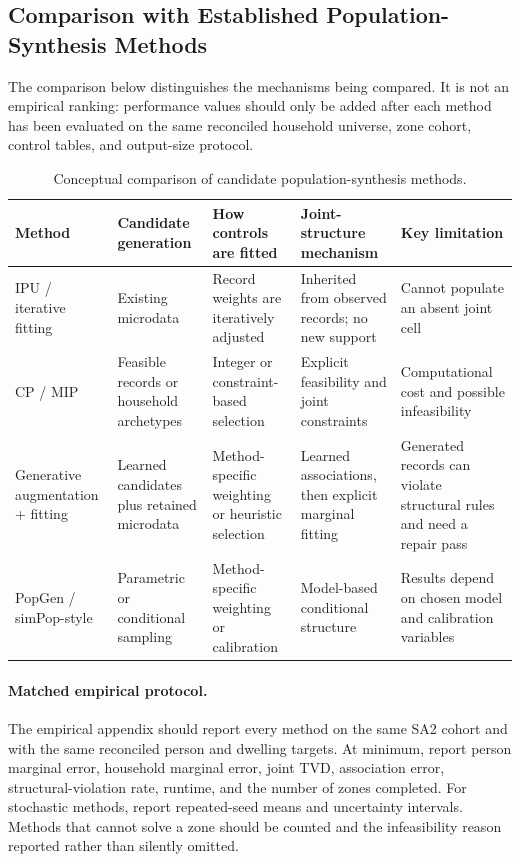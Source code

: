 
\subsection{Comparison with Established Population-Synthesis Methods}
\label{sec:known_methods_comparison}

The comparison below distinguishes the mechanisms being compared. It is not
an empirical ranking: performance values should only be added after each
method has been evaluated on the same reconciled household universe, zone
cohort, control tables, and output-size protocol.

\begin{table}[htbp]
\centering
\small
\caption{Conceptual comparison of candidate population-synthesis methods.}
\label{tab:known-methods-comparison}
\begin{tabular}{@{}p{}p{}p{}p{}p{}@{}}
\toprule
\textbf{Method} & \textbf{Candidate generation} & \textbf{How controls are fitted} &
\textbf{Joint-structure mechanism} & \textbf{Key limitation} \\
\midrule
IPU / iterative fitting &
Existing microdata &
Record weights are iteratively adjusted &
Inherited from observed records; no new support &
Cannot populate an absent joint cell \\
\addlinespace
CP / MIP &
Feasible records or household archetypes &
Integer or constraint-based selection &
Explicit feasibility and joint constraints &
Computational cost and possible infeasibility \\
\addlinespace
Generative augmentation + fitting &
Learned candidates plus retained microdata &
Method-specific weighting or heuristic selection &
Learned associations, then explicit marginal fitting &
Generated records can violate structural rules and need a repair pass \\
\addlinespace
PopGen / simPop-style &
Parametric or conditional sampling &
Method-specific weighting or calibration &
Model-based conditional structure &
Results depend on chosen model and calibration variables \\
\bottomrule
\end{tabular}
\end{table}

\paragraph{Matched empirical protocol.}
The empirical appendix should report every method on the same SA2 cohort and
with the same reconciled person and dwelling targets. At minimum, report
person marginal error, household marginal error, joint TVD, association error,
structural-violation rate, runtime, and the number of zones completed. For
stochastic methods, report repeated-seed means and uncertainty intervals.
Methods that cannot solve a zone should be counted and the infeasibility
reason reported rather than silently omitted.

